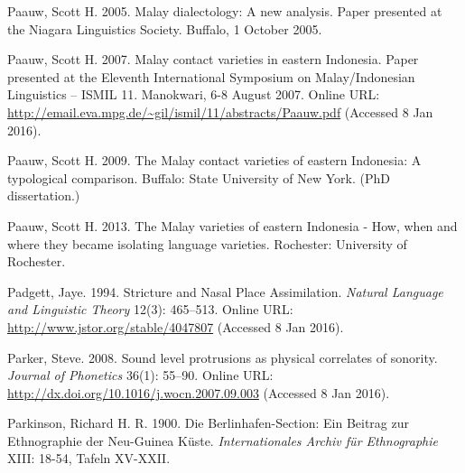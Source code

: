 \begin{styleCitaviBibliographyEntry}
Paauw, Scott H. 2005. Malay dialectology: A new analysis. Paper presented at the Niagara Linguistics Society. Buffalo, 1 October 2005.
\end{styleCitaviBibliographyEntry}

\begin{styleCitaviBibliographyEntry}
Paauw, Scott H. 2007. Malay contact varieties in eastern Indonesia. Paper presented at the Eleventh International Symposium on Malay/Indonesian Linguistics – ISMIL 11. Manokwari, 6-8 August 2007. Online URL: \url{http://email.eva.mpg.de/~gil/ismil/11/abstracts/Paauw.pdf} (Accessed 8 Jan 2016).
\end{styleCitaviBibliographyEntry}

\begin{styleCitaviBibliographyEntry}
Paauw, Scott H. 2009. The Malay contact varieties of eastern Indonesia: A typological comparison. Buffalo: State University of New York. (PhD dissertation.)
\end{styleCitaviBibliographyEntry}

\begin{styleCitaviBibliographyEntry}
Paauw, Scott H. 2013. The Malay varieties of eastern Indonesia - How, when and where they became isolating language varieties. Rochester: University of Rochester.
\end{styleCitaviBibliographyEntry}

\begin{styleCitaviBibliographyEntry}
Padgett, Jaye. 1994. Stricture and Nasal Place Assimilation. \textit{Natural Language and Linguistic Theory} 12(3): 465–513. Online URL: \url{http://www.jstor.org/stable/4047807} (Accessed 8 Jan 2016).
\end{styleCitaviBibliographyEntry}

\begin{styleCitaviBibliographyEntry}
Parker, Steve. 2008. Sound level protrusions as physical correlates of sonority. \textit{Journal of Phonetics} 36(1): 55–90. Online URL: \url{http://dx.doi.org/10.1016/j.wocn.2007.09.003} (Accessed 8 Jan 2016).
\end{styleCitaviBibliographyEntry}

\begin{styleCitaviBibliographyEntry}
Parkinson, Richard H. R. 1900. Die Berlinhafen-Section: Ein Beitrag zur Ethnographie der Neu-Guinea Küste. \textit{Internationales Archiv für Ethnographie} XIII: 18-54, Tafeln XV-XXII.
\end{styleCitaviBibliographyEntry}

